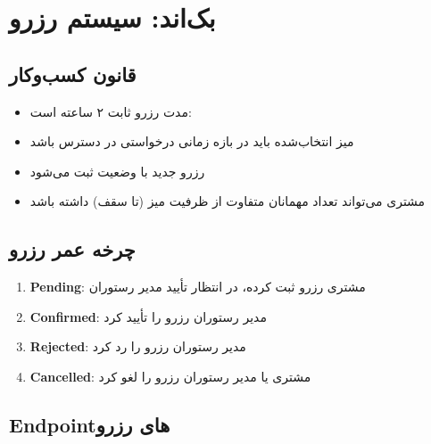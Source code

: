 \documentclass[12pt, a4paper]{article}
\begin{document}
\newpage

\section{بک‌اند: سیستم رزرو}

\subsection{قانون کسب‌وکار}
\begin{itemize}[rightmargin=0.5cm]
  \item مدت رزرو ثابت ۲ ساعته است: 
  \item میز انتخاب‌شده باید در بازه زمانی درخواستی در دسترس باشد
  \item رزرو جدید با وضعیت  ثبت می‌شود
  \item مشتری می‌تواند تعداد مهمانان متفاوت از ظرفیت میز (تا سقف) داشته باشد
\end{itemize}

\subsection{چرخه عمر رزرو}
\begin{enumerate}[rightmargin=0.5cm]
  \item \textbf{Pending}: مشتری رزرو ثبت کرده، در انتظار تأیید مدیر رستوران
  \item \textbf{Confirmed}: مدیر رستوران رزرو را تأیید کرد
  \item \textbf{Rejected}: مدیر رستوران رزرو را رد کرد
  \item \textbf{Cancelled}: مشتری یا مدیر رستوران رزرو را لغو کرد
\end{enumerate}

\subsection{Endpoint‌های رزرو}
\end{document}
